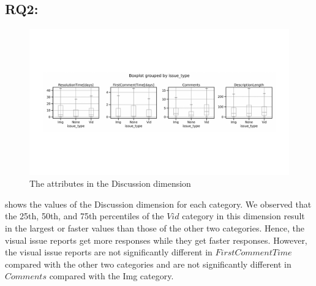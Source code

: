 \subsection*{RQ2: \RQtwo{}}
\begin{figure}[t]
    \centering
    \includegraphics[width=1\linewidth]{./figures/discussions.pdf}
    \caption{The attributes in the Discussion dimension}
    \label{fig:discussion}
\end{figure}


shows the values of the Discussion dimension
for each category. 
We observed that the 25th, 50th, and 75th percentiles of 
the $Vid$ category in 
this dimension
result in the largest or faster values than those of 
the other two categories.
Hence, the visual issue reports get more responses 
while they get faster responses. 
However, the visual issue reports are not 
significantly different in $FirstCommentTime$ 
compared with the other two categories and 
are not significantly different in $Comments$ 
compared with the Img category.

